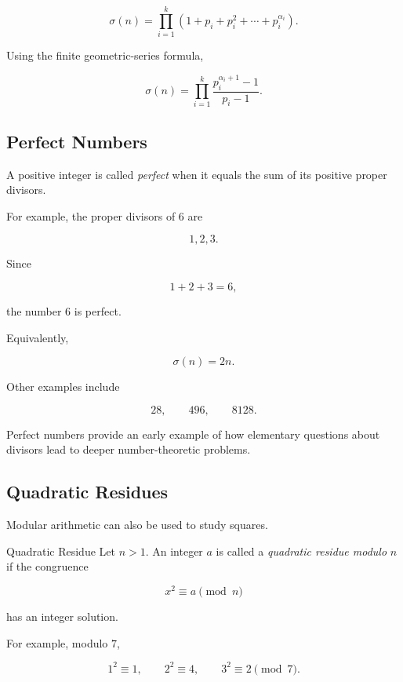 \[
\boxed{
\sigma(n)
=
\prod_{i=1}^{k}
\left(
1+p_i+p_i^2+\cdots+p_i^{\alpha_i}
\right).
}
\]

Using the finite geometric-series formula,

\[
\boxed{
\sigma(n)
=
\prod_{i=1}^{k}
\frac{p_i^{\alpha_i+1}-1}{p_i-1}.
}
\]

\subsection{Perfect Numbers}
\label{subsec:perfect-numbers}

A positive integer is called \emph{perfect} when it equals the sum of its
positive proper divisors.

For example, the proper divisors of \(6\) are

\[ 1,2,3. \]

Since

\[ 1+2+3=6, \]

the number \(6\) is perfect.

Equivalently,

\[ \sigma(n)=2n. \]

Other examples include

\[ 28,\qquad496,\qquad8128. \]

Perfect numbers provide an early example of how elementary questions about
divisors lead to deeper number-theoretic problems.

\subsection{Quadratic Residues}
\label{subsec:quadratic-residues-introduction}

Modular arithmetic can also be used to study squares.

\begin{definitionbox}{Quadratic Residue}
Let \(n>1\). An integer \(a\) is called a \emph{quadratic residue modulo}
\(n\) if the congruence

\[ x^2\equiv a\pmod n \]

has an integer solution.
\end{definitionbox}

For example, modulo \(7\),

\[ 1^2\equiv1,\qquad2^2\equiv4,\qquad3^2\equiv2\pmod7. \]


